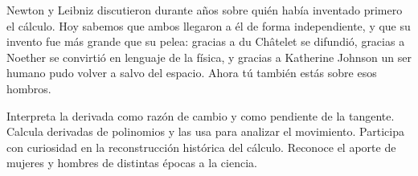 \documentclass[11pt]{article}
\begin{document}

Newton y Leibniz discutieron durante años sobre quién había inventado
primero el cálculo. Hoy sabemos que ambos llegaron a él de forma
independiente, y que su invento fue más grande que su pelea: gracias a
du Châtelet se difundió, gracias a Noether se convirtió en lenguaje de la
física, y gracias a Katherine Johnson un ser humano pudo volver a salvo
del espacio. Ahora tú también estás sobre esos hombros.

\matrizevaluacion
  {Interpreta la derivada como razón de cambio y como pendiente de la tangente.}
  {Calcula derivadas de polinomios y las usa para analizar el movimiento.}
  {Participa con curiosidad en la reconstrucción histórica del cálculo.}
  {Reconoce el aporte de mujeres y hombres de distintas épocas a la ciencia.}

\autoevaluacion

\seguimientodocente
\end{document}
